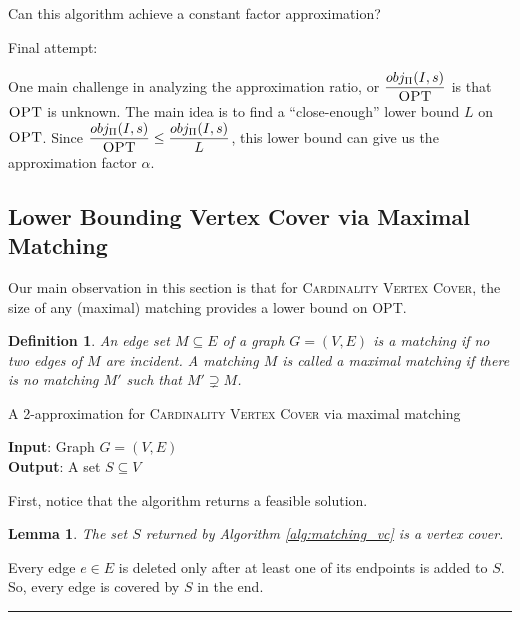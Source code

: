 \documentclass[twoside]{article}
\newtheorem{lemma}{Lemma}
\newtheorem{definition}{Definition}
\newenvironment{proof}{{\bf Proof.}}{\hfill\rule{2mm}{2mm}}
\newcommand{\OPT}{\mbox{\sc OPT}}
\begin{document}
Can this algorithm achieve a constant factor approximation?

Final attempt:

One main challenge in analyzing the approximation ratio, or $\dfrac{obj_\Pi(I, s)}{\OPT}$ is that $\OPT$ is unknown. The main idea is to find a ``close-enough'' lower bound $L$ on $\OPT$. Since $\dfrac{obj_\Pi(I, s)}{\OPT} \leq \dfrac{obj_\Pi(I, s)}{L}$, this lower bound can give us the approximation factor $\alpha$.

\subsection{Lower Bounding Vertex Cover via Maximal Matching}

Our main observation in this section is that for \textsc{Cardinality Vertex Cover}, the size of any (maximal) matching provides a lower bound on \OPT.

\begin{definition}
An edge set $M \subseteq E$ of a graph $G = (V, E)$ is a \emph{matching} if no two edges of $M$ are incident. A matching $M$ is called a \emph{maximal matching} if there is no matching $M'$ such that $M' \supsetneq M$.
\end{definition}

\begin{algorithm}[H]
\caption{A  2-approximation for \textsc{Cardinality Vertex Cover} via maximal matching}
{\bf Input}: Graph $G = (V, E)$ \\
{\bf Output}: A set $S \subseteq V$
\begin{algorithmic}\label{alg:matching_vc}
\ENDWHILE
{}
\end{algorithmic}
\end{algorithm}

First, notice that the algorithm returns a feasible solution.

\begin{lemma}
The set $S$ returned by Algorithm \ref{alg:matching_vc} is a vertex cover.
\end{lemma}

\begin{proof}
Every edge $e \in E$ is deleted only after at least one of its endpoints is added to $S$. So, every edge is covered by $S$ in the end.
\end{proof}
\end{document}
